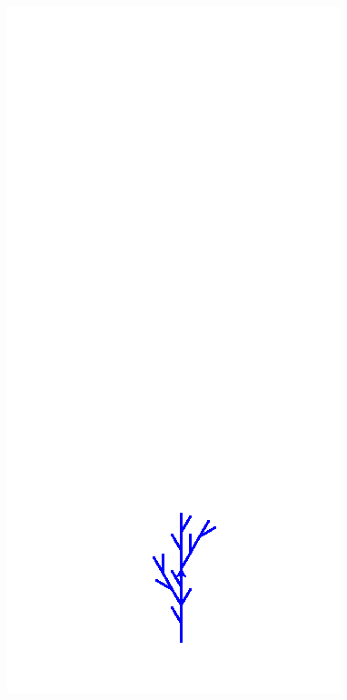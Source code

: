\documentclass[11pt,class=report,crop=false]{standalone}
\begin{document}
\begin{center}
\includegraphics[scale=\myscale,scale=0.25]{figures/plante-01-2}

\end{center}
\end{document}
